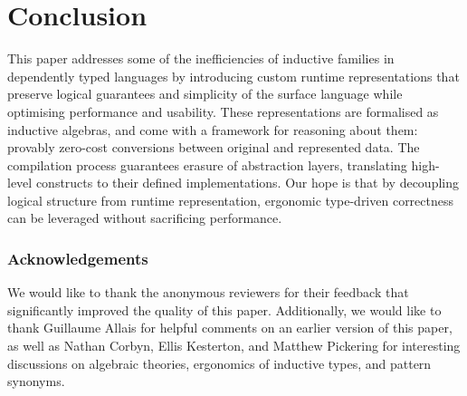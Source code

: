 \section{Conclusion}

This paper addresses some of the inefficiencies of inductive families in
dependently typed languages by introducing custom runtime representations that
preserve logical guarantees and simplicity of the surface language while
optimising performance and usability. These representations are formalised as inductive
algebras, and come with a framework for reasoning about them: provably zero-cost
conversions between original and represented data.
The compilation process guarantees erasure of abstraction layers, translating
high-level constructs to their defined implementations. Our hope is that by
decoupling logical structure from runtime representation, ergonomic type-driven
correctness can be leveraged without sacrificing performance.


\subsubsection{Acknowledgements}
We would like to thank the anonymous reviewers for their feedback that
significantly improved the quality of this paper. Additionally, we would like to
thank Guillaume Allais for helpful comments on an earlier version of this paper,
as well as Nathan Corbyn, Ellis Kesterton, and Matthew Pickering for interesting
discussions on algebraic theories, ergonomics of inductive types, and pattern
synonyms.
